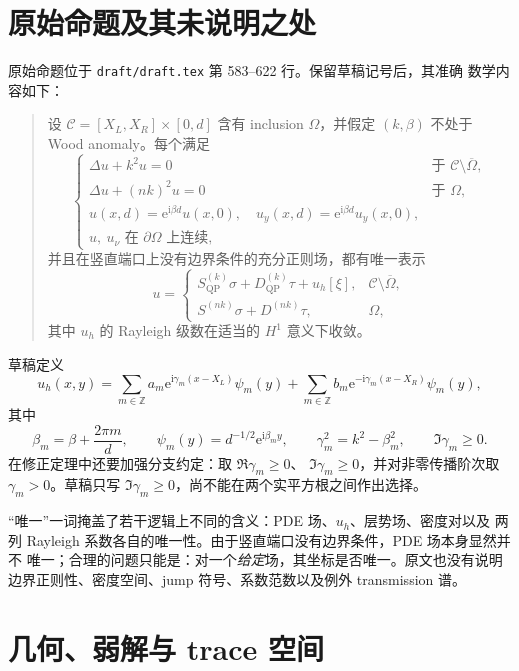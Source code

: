 \documentclass[UTF8,11pt,fontset=fandol]{ctexart}
\newcommand{\C}{\mathcal C}
\newcommand{\Om}{\Omega}
\newcommand{\Z}{\mathbb Z}
\newcommand{\ii}{\mathrm i}
\newcommand{\ee}{\mathrm e}
\newcommand{\QP}{\mathrm{QP}}
\theoremstyle{plain}
\theoremstyle{definition}
\theoremstyle{remark}
\begin{document}
\section{原始命题及其未说明之处}
\label{sec:source}

原始命题位于 \texttt{draft/draft.tex} 第 583--622 行。保留草稿记号后，其准确
数学内容如下：

\begin{quote}
设 \(\C=[X_L,X_R]\times[0,d]\) 含有 inclusion \(\Om\)，并假定
\((k,\beta)\) 不处于 Wood anomaly。每个满足
\[
\begin{cases}
\Delta u+k^2u=0&\text{于 }\C\setminus\overline\Om,\\
\Delta u+(nk)^2u=0&\text{于 }\Om,\\
u(x,d)=\ee^{\ii\beta d}u(x,0),\quad
u_y(x,d)=\ee^{\ii\beta d}u_y(x,0),\\
u,\ u_\nu\text{ 在 }\partial\Om\text{ 上连续},
\end{cases}
\]
并且在竖直端口上没有边界条件的充分正则场，都有唯一表示
\[
u=\begin{cases}
S_{\QP}^{(k)}\sigma+D_{\QP}^{(k)}\tau+u_h[\xi],
&\C\setminus\overline\Om,\\
S^{(nk)}\sigma+D^{(nk)}\tau,&\Om,
\end{cases}
\]
其中 \(u_h\) 的 Rayleigh 级数在适当的 \(H^1\) 意义下收敛。
\end{quote}

草稿定义
\begin{equation}
u_h(x,y)=\sum_{m\in\Z}a_m\ee^{\ii\gamma_m(x-X_L)}\psi_m(y)
+\sum_{m\in\Z}b_m\ee^{-\ii\gamma_m(x-X_R)}\psi_m(y),
\label{eq:uh}
\end{equation}
其中
\begin{equation}
\beta_m=\beta+\frac{2\pi m}{d},\qquad
\psi_m(y)=d^{-1/2}\ee^{\ii\beta_my},\qquad
\gamma_m^2=k^2-\beta_m^2,\qquad \Im\gamma_m\geq0.
\label{eq:modes}
\end{equation}
在修正定理中还要加强分支约定：取 \(\Re\gamma_m\geq0\)、
\(\Im\gamma_m\geq0\)，并对非零传播阶次取 \(\gamma_m>0\)。草稿只写
\(\Im\gamma_m\geq0\)，尚不能在两个实平方根之间作出选择。

“唯一”一词掩盖了若干逻辑上不同的含义：PDE 场、\(u_h\)、层势场、密度对以及
两列 Rayleigh 系数各自的唯一性。由于竖直端口没有边界条件，PDE 场本身显然并不
唯一；合理的问题只能是：对一个\emph{给定}场，其坐标是否唯一。原文也没有说明
边界正则性、密度空间、jump 符号、系数范数以及例外 transmission 谱。

\section{几何、弱解与 trace 空间}
\label{sec:spaces}
\end{document}
